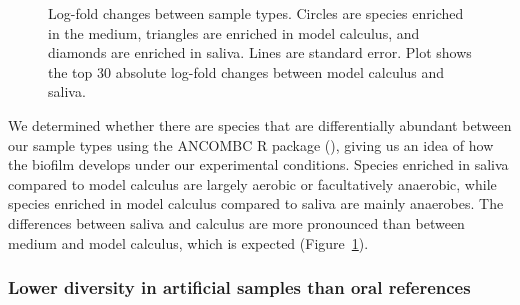 \documentclass[
  b5paper,
]{book}
\begin{document}
\begin{figure}


\caption{\label{fig-diffabund-byoc}Log-fold changes between sample
types. Circles are species enriched in the medium, triangles are
enriched in model calculus, and diamonds are enriched in saliva. Lines
are standard error. Plot shows the top 30 absolute log-fold changes
between model calculus and saliva.}

\end{figure}%

We determined whether there are species that are differentially abundant
between our sample types using the ANCOMBC R package
(), giving us an idea
of how the biofilm develops under our experimental conditions. Species
enriched in saliva compared to model calculus are largely aerobic or
facultatively anaerobic, while species enriched in model calculus
compared to saliva are mainly anaerobes. The differences between saliva
and calculus are more pronounced than between medium and model calculus,
which is expected (Figure~\ref{fig-diffabund-byoc}).

\subsubsection{Lower diversity in artificial samples than oral
references}\label{lower-diversity-in-artificial-samples-than-oral-references}
\end{document}
